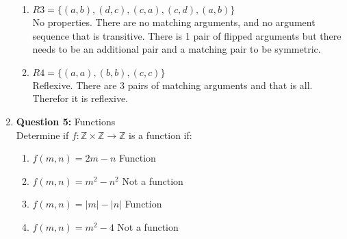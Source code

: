 \documentclass[11pt]{article}
\begin{document}
\begin{enumerate}
\begin{enumerate}[label=(\alph*)]
    \item 
    $R3 = \{(a,b),(d,c),(c,a),(c,d),(a,b)\}$ \\
    No properties. There are no matching arguments, and no argument sequence that is transitive. There is 1 pair of flipped arguments but there needs to be an additional pair and a matching pair to be symmetric.
    \item 
    $R4 = \{(a,a),(b,b),(c,c)\}$ \\
    Reflexive. There are 3 pairs of matching arguments and that is all. Therefor it is reflexive.
\end{enumerate}
\item
\textbf{Question 5:} Functions \\
Determine if $f: \mathbb{Z} \times \mathbb{Z} \rightarrow \mathbb{Z}$ is a function if: 
\begin{enumerate}[label=(\alph*)]
    \item 
    $f(m,n) = 2m-n$
    Function
    \item 
    $f(m,n) = m^2 - n^2$
    Not a function
    \item 
    $f(m,n) = |m|-|n|$
    Function
    \item 
    $f(m,n) = m^2 - 4$
    Not a function
\end{enumerate}
\end{enumerate}
\end{document}

